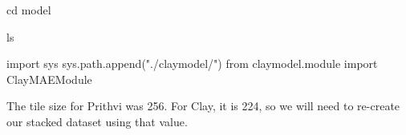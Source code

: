\documentclass[
  letterpaper,
  DIV=11,
  numbers=noendperiod]{scrreprt}
\newenvironment{Shaded}{\begin{snugshade}}{\end{snugshade}}
\newcommand{\ImportTok}[1]{\textcolor[rgb]{0.00,0.46,0.62}{#1}}
\newcommand{\NormalTok}[1]{\textcolor[rgb]{0.00,0.23,0.31}{#1}}
\newcommand{\StringTok}[1]{\textcolor[rgb]{0.13,0.47,0.30}{#1}}
\begin{document}
\begin{Shaded}
\begin{Highlighting}[]
\NormalTok{cd model}
\end{Highlighting}
\end{Shaded}

\begin{Shaded}
\begin{Highlighting}[]
\NormalTok{ls}
\end{Highlighting}
\end{Shaded}

\begin{Shaded}
\begin{Highlighting}[]
\ImportTok{import}\NormalTok{ sys}
\NormalTok{sys.path.append(}\StringTok{"./claymodel/"}\NormalTok{)}
\ImportTok{from}\NormalTok{ claymodel.module }\ImportTok{import}\NormalTok{ ClayMAEModule}
\end{Highlighting}
\end{Shaded}

The tile size for Prithvi was 256. For Clay, it is 224, so we will need
to re-create our stacked dataset using that value.
\end{document}
